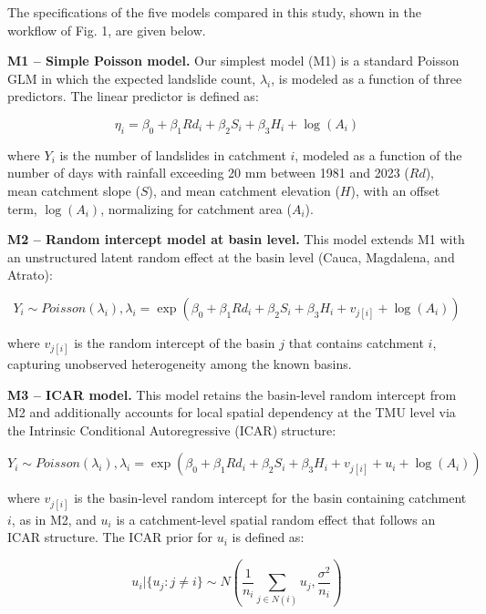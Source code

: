 \documentclass[journal abbreviation, manuscript]{copernicus}
\newcommand{\hl}[1]{#1}
\newcommand{\hlE}[1]{#1}
\begin{document}
\hl{The specifications of the five models compared in this study, shown in the workflow of Fig. 1, are given below.}

\hl{\textbf{M1 -- Simple Poisson model.} Our simplest model (M1) is a standard Poisson GLM in which the expected landslide count, $\lambda_i$, is modeled as a function of three predictors. The linear predictor is defined as:}

\begin{equation}
\eta_i = \beta_0 + \beta_1 Rd_i + \beta_2 S_i + \beta_3 H_i + \log(A_i)
\end{equation}

\hl{where $Y_i$ is the number of landslides in catchment $i$, modeled as a function of the number of days with rainfall exceeding 20 mm} \hlE{between 1981 and 2023} \hl{($Rd$), mean catchment slope ($S$), and mean catchment elevation ($H$), with an offset term, $\log(A_i)$, normalizing for catchment area ($A_i$).}

\hl{\textbf{M2 -- Random intercept model at basin level.} This model extends M1 with an unstructured latent random effect at the basin level (Cauca, Magdalena, and Atrato):}

\begin{equation}
Y_i \sim Poisson(\lambda_i), \lambda_i = \exp(\beta_0 + \beta_1 Rd_i + \beta_2 S_i + \beta_3 H_i + v_{j[i]} + \log(A_i))
\end{equation}

\hl{where} \hlE{$v_{j[i]}$ is the random intercept of the basin $j$ that contains catchment $i$,} \hl{capturing unobserved heterogeneity among the known basins.}

\hl{\textbf{M3 -- ICAR model.} This model retains the basin-level random intercept from M2 and additionally accounts for local spatial dependency at the TMU level via the Intrinsic Conditional Autoregressive (ICAR) structure:}

\begin{equation}
Y_i \sim Poisson(\lambda_i), \lambda_i = \exp(\beta_0 + \beta_1 Rd_i + \beta_2 S_i + \beta_3 H_i + v_{j[i]} + u_i + \log(A_i))
\end{equation}

\hl{where $v_{j[i]}$ is the basin-level random intercept for the basin containing catchment $i$, as in M2, and $u_i$ is a catchment-level spatial random effect that follows an ICAR structure. The ICAR prior for $u_i$ is defined as:}

\begin{equation}
u_i | \{u_j : j \neq i\} \sim N \left( \frac{1}{n_i} \sum_{j \in N(i)} u_j, \frac{\sigma^2}{n_i} \right)
\end{equation}
\end{document}
